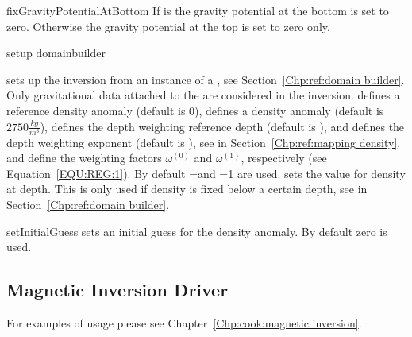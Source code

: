 \begin{methoddesc}[GravityInversion]{fixGravityPotentialAtBottom}{}
If  is \True the gravity potential at the bottom is set to zero. Otherwise  the gravity
 potential at the top is set to zero only. 
\end{methoddesc}

\begin{methoddesc}[GravityInversion]{setup}{
domainbuilder
}

sets up the inversion from an instance  of a , see Section~\ref{Chp:ref:domain builder}.
Only gravitational data attached to the  are considered in the inversion.
 defines a reference density anomaly (default is 0), 
 defines a density anomaly (default is $2750 \frac{kg}{m^3}$),
 defines the depth weighting reference depth (default is \None), and
 defines the depth weighting exponent (default is \None),
see  in Section~\ref{Chp:ref:mapping density}.
 and  define the weighting factors
$\omega^{(0)}$ and
$\omega^{(1)}$, respectively (see Equation~\ref{EQU:REG:1}).
By default =\None and =1 are used.
 sets the value for density at depth. This is only used if density is fixed below a certain depth,
see  in Section~\ref{Chp:ref:domain builder}.
\end{methoddesc}

\begin{methoddesc}[GravityInversion]{setInitialGuess}{}
sets an initial guess for the density anomaly. By default zero is used.
\end{methoddesc}

\subsection{Magnetic Inversion Driver}
For examples of usage please see Chapter~\ref{Chp:cook:magnetic inversion}.

